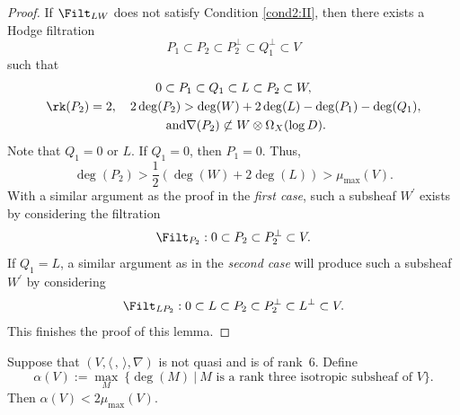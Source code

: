 \begin{proof}
If $\Filt_{LW}$ does not satisfy Condition \eqref{cond2:II}, then there exists a Hodge filtration
\[
P_1\subset P_2\subset P_2^\perp\subset Q_1^\perp\subset V
\]
such that
\begin{gather*}
0\subset P_1\subset Q_1\subset L \subset P_2\subset W,
\\
\rk(P_2)=2,\quad 2\deg(P_2)>\deg(W)+2\deg(L)-\deg(P_1)-\deg(Q_1),
\\
\tag*{and}
\nabla(P_2)\not\subset W\otimes\Omega_X(\log D).
\end{gather*}
Note that $Q_1=0$ or $L$. If $Q_1=0$, then $P_1=0$. Thus,
\[
\deg(P_2)>\dfrac{1}{2}(\deg(W)+2\deg(L))>\mu_{\max}(V).
\]
With a similar argument as the proof in the \emph{first case}, such a subsheaf $W^\prime$ exists by considering the filtration
\[
\Filt_{P_2}:0\subset P_2\subset P_2^\perp\subset V.
\]
If $Q_1=L$, a similar argument as in the \emph{second case} will produce such a subsheaf $W^\prime$ by considering
\[
\Filt_{LP_2}:0\subset L\subset P_2\subset P_2^\perp\subset L^\perp\subset V.
\]
This finishes the proof of this lemma.
\end{proof}

\begin{lem}\label{lagrange}
Suppose that $(V,\langle \,, \, \rangle,\nabla)$ is not quasi \grsemistable and is of rank~$6$. Define
\[
\alpha(V):=\max_{M}\ \{\deg(M)\ |\ M \text{ is a rank three isotropic subsheaf of $V$}\}.
\]
Then $\alpha(V)<2\mu_{\max}(V)$.
\end{lem}

